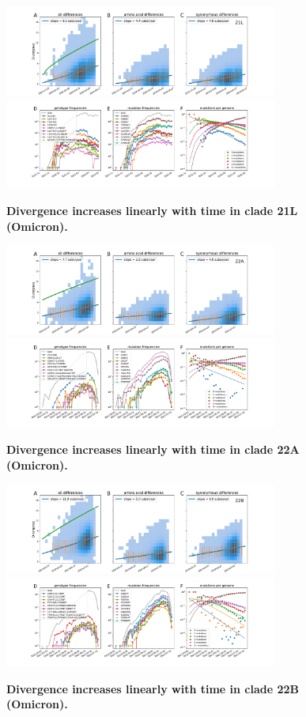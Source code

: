 \begin{figure}[h]
    \includegraphics[width=0.8\textwidth]{figures/rtt/21L_rtt.pdf}
    \includegraphics[width=0.8\textwidth]{figures/counts/21L_counts.pdf}
    \caption{{\bf Divergence increases linearly with time in clade 21L (Omicron).}
    \label{fig:21L_divergence}}
\end{figure}

\begin{figure}[h]
    \includegraphics[width=0.8\textwidth]{figures/rtt/22A_rtt.pdf}
    \includegraphics[width=0.8\textwidth]{figures/counts/22A_counts.pdf}
    \caption{{\bf Divergence increases linearly with time in clade 22A (Omicron).}
    \label{fig:22A_divergence}}
\end{figure}

\begin{figure}[h]
    \includegraphics[width=0.8\textwidth]{figures/rtt/22B_rtt.pdf}
    \includegraphics[width=0.8\textwidth]{figures/counts/22B_counts.pdf}
    \caption{{\bf Divergence increases linearly with time in clade 22B (Omicron).}
    \label{fig:22B_divergence}}
\end{figure}
